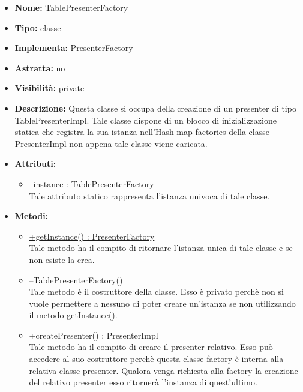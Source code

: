 			
			\begin{itemize}
			\item \textbf{Nome:} TablePresenterFactory
			\item \textbf{Tipo:} classe
			
		\item \textbf{Implementa:}
		PresenterFactory
		\item \textbf{Astratta:}
		no
			\item \textbf{Visibilità:} private
			\item \textbf{Descrizione:} Questa classe si occupa della creazione di un presenter di tipo TablePresenterImpl. Tale classe dispone di un blocco di inizializzazione statica che registra la sua istanza nell'Hash map factories della classe PresenterImpl non appena tale classe viene caricata.
			\item \textbf{Attributi:}
				\begin{itemize}
				\setlength{\itemsep}{5pt}
				
					\item[\ding{111}] \underline{--instance : TablePresenterFactory} \\ [1mm] Tale attributo statico rappresenta l'istanza univoca di tale classe.
				\end{itemize}
		
			\item \textbf{Metodi:}
				\begin{itemize}
				\setlength{\itemsep}{5pt}
				
					\item[\ding{111}] {\underline{+getInstance() : PresenterFactory}} \\ [1mm] Tale metodo ha il compito di ritornare l'istanza unica di tale classe e se non esiste la crea.
					\item[\ding{111}] {{--TablePresenterFactory()}} \\ [1mm] Tale metodo è il costruttore della classe. Esso è privato perchè non si vuole permettere a nessuno di poter creare un'istanza se non utilizzando il metodo getInstance().
					\item[\ding{111}] {{+createPresenter() : PresenterImpl}} \\ [1mm] Tale metodo ha il compito di creare il presenter relativo. Esso può accedere al suo costruttore perchè questa classe factory è interna alla relativa classe presenter. Qualora venga richiesta alla factory la creazione del relativo presenter esso ritornerà l'instanza di quest'ultimo.
				\end{itemize}
		
			\end{itemize}

			